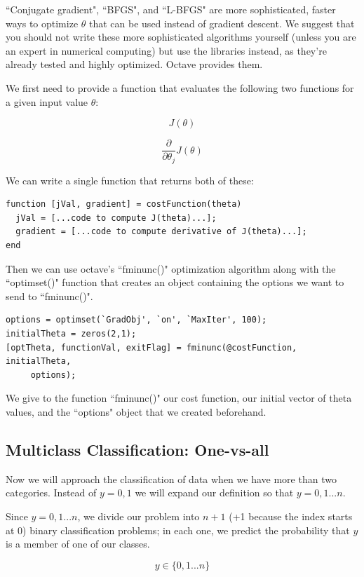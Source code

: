 \documentclass[UTF8]{article}
\begin{document}
``Conjugate gradient", ``BFGS", and ``L-BFGS" are more sophisticated, faster ways to optimize $\theta$ that can be used instead of gradient descent. We suggest that you should not write these more sophisticated algorithms yourself (unless you are an expert in numerical computing) but use the libraries instead, as they're already tested and highly optimized. Octave provides them.

We first need to provide a function that evaluates the following two functions for a given input value $\theta$:

\[ J(\theta) \]

\[ \dfrac{\partial}{\partial \theta_j}J(\theta)\]

We can write a single function that returns both of these:

\begin{lstlisting}
function [jVal, gradient] = costFunction(theta)
  jVal = [...code to compute J(theta)...];
  gradient = [...code to compute derivative of J(theta)...];
end
\end{lstlisting}

Then we can use octave's ``fminunc()" optimization algorithm along with the ``optimset()" function that creates an object containing the options we want to send to ``fminunc()".

\begin{lstlisting}
options = optimset(`GradObj', `on', `MaxIter', 100);
initialTheta = zeros(2,1);
[optTheta, functionVal, exitFlag] = fminunc(@costFunction, initialTheta, 
     options);
\end{lstlisting}
     
We give to the function ``fminunc()" our cost function, our initial vector of theta values, and the ``options" object that we created beforehand.

\subsection{Multiclass Classification: One-vs-all}

Now we will approach the classification of data when we have more than two categories. Instead of $y = {0,1}$ we will expand our definition so that $y = {0,1...n}$.

Since $y = {0,1...n}$, we divide our problem into $n+1$ (+1 because the index starts at 0) binary classification problems; in each one, we predict the probability that $y$ is a member of one of our classes.

\[ y \in \lbrace0, 1 ... n\rbrace \]
\end{document}
